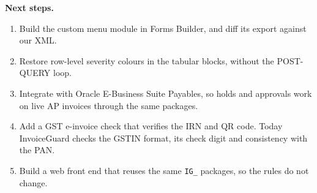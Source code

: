 \documentclass[10pt,a4paper]{article}
\begin{document}
\textbf{Next steps.}
\begin{enumerate}[leftmargin=1.5em,itemsep=2pt]
  \item Build the custom menu module in Forms Builder, and diff its export against our XML.
  \item Restore row-level severity colours in the tabular blocks, without the POST-QUERY loop.
  \item Integrate with Oracle E-Business Suite Payables, so holds and approvals work on live AP invoices through the same packages.
  \item Add a GST e-invoice check that verifies the IRN and QR code. Today InvoiceGuard checks the GSTIN format, its check digit and consistency with the PAN.
  \item Build a web front end that reuses the same \texttt{IG\_} packages, so the rules do not change.
\end{enumerate}
\end{document}
